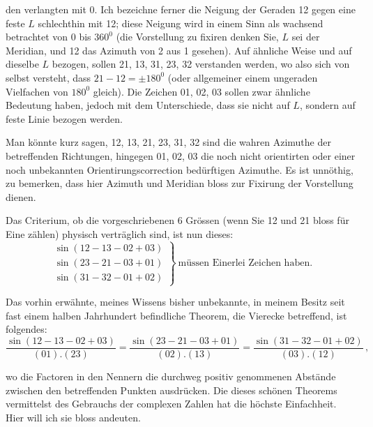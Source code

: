  den verlangten mit 0. Ich bezeichne ferner die Neigung der Geraden 12 gegen eine feste $L$ schlechthin mit 12; diese Neigung wird in einem  Sinn als wachsend betrachtet von 0 bis $360^0$ (die Vorstellung zu fixiren denken Sie, $L$ sei der Meridian, und 12 das Azimuth von 2 aus 1 gesehen). Auf ähnliche Weise und auf dieselbe $L$ bezogen, sollen 21, 13, 31, 23, 32 verstanden werden, wo also sich von selbst versteht, dass $21-12=\pm180^0$ (oder allgemeiner einem ungeraden Vielfachen von $180^0$ gleich). Die Zeichen 01, 02, 03 sollen zwar ähnliche Bedeutung haben, jedoch mit dem Unterschiede, dass sie nicht auf $L$, sondern auf  feste Linie bezogen werden.

Man könnte kurz sagen, 12, 13, 21, 23, 31, 32 sind die wahren Azimuthe der betreffenden Richtungen, hingegen 01, 02, 03 die noch nicht orientirten oder einer noch unbekannten Orientirungscorrection bedürftigen Azimuthe. Es ist unnöthig, zu bemerken, dass hier Azimuth und Meridian bloss zur Fixirung der Vorstellung dienen.

Das Criterium, ob die vorgeschriebenen 6 Grössen (wenn Sie 12 und 21 bloss für Eine zählen) physisch verträglich sind, ist nun dieses:
\[
\left.
\begin{array}{l}
\sin(12-13-02+03)\\
\sin(23-21-03+01)\\
\sin(31-32-01+02)
\end{array}
\right\}\ \text{müssen Einerlei Zeichen haben.}
\]

Das vorhin erwähnte, meines Wissens bisher unbekannte, in meinem Besitz seit fast einem halben Jahrhundert befindliche Theorem, die Vierecke betreffend, ist folgendes:
\[
\frac{\sin(12-13-02+03)}{(01).(23)}=\frac{\sin(23-21-03+01)}{(02).(13)}=\frac{\sin(31-32-01+02)}{(03).(12)}\,,
\]

wo die Factoren in den Nennern die durchweg positiv genommenen Abstände zwischen den betreffenden Punkten ausdrücken. Die  dieses schönen Theorems vermittelst des Gebrauchs der complexen Zahlen hat die höchste Einfachheit. Hier will ich sie bloss andeuten.



